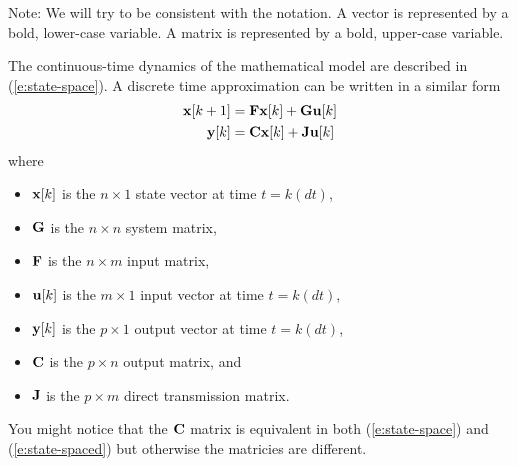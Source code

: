 Note: We will try to be consistent with the notation.  A vector is represented by a bold, lower-case variable.  A matrix is represented by a bold, upper-case variable.

The continuous-time dynamics of the mathematical model are described in (\ref{e:state-space}).  A discrete time approximation can be written in a similar form
\begin{align}
\label{e:state-spaced}
\mbox{${\bf x}$}[k+1] & = \mbox{${\bf F}$} \mbox{${\bf x}$}[k] + \mbox{${\bf G}$}\mbox{${\bf u}$}[k] \nonumber \\
\mbox{${\bf y}$}[k] & = \mbox{${\bf C}$}\mbox{${\bf x}$}[k] + \mbox{${\bf J}$}\mbox{${\bf u}$}[k]
\end{align}
where
\begin{itemize}
\item $\mbox{${\bf x}$}[k]$ is the $n \times 1$ state vector at time $t=k(dt)$,
\item $\mbox{${\bf G}$}$ is the $n \times n$ system matrix,
\item $\mbox{${\bf F}$}$ is the $n \times m$ input matrix,
\item $\mbox{${\bf u}$}[k]$ is the $m \times 1$ input vector at time $t=k(dt)$,
\item $\mbox{${\bf y}$}[k]$ is the $p \times 1$ output vector at time $t=k(dt)$,
\item $\mbox{${\bf C}$}$ is the $p \times n$ output matrix, and
\item $\mbox{${\bf J}$}$ is the $p \times m$ direct transmission matrix.
\end{itemize}
You might notice that the $\mbox{${\bf C}$}$ matrix is equivalent in both (\ref{e:state-space}) and (\ref{e:state-spaced}) but otherwise the matricies are different.


